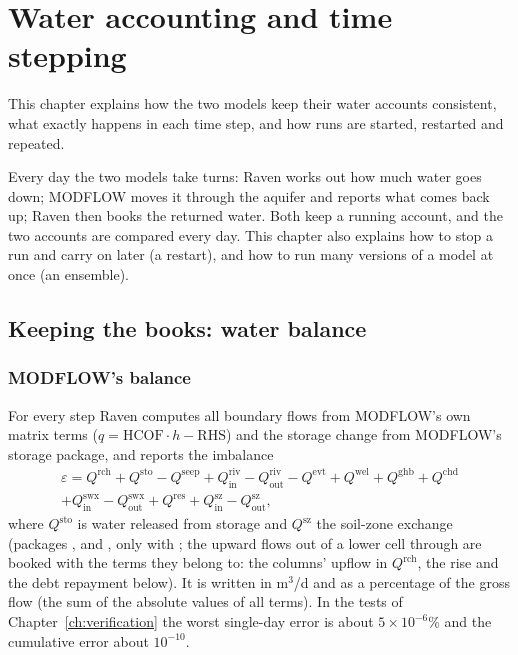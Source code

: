 \chapter{Water accounting and time stepping}\label{ch:c5}
This chapter explains how the two models keep their water accounts consistent, what exactly happens in each time step,
and how runs are started, restarted and repeated.

\begin{plain}
Every day the two models take turns: Raven works out how much water goes down; MODFLOW moves it through the aquifer and
reports what comes back up; Raven then books the returned water. Both keep a running account, and the two accounts are
compared every day. This chapter also explains how to stop a run and carry on later (a restart), and how to run many
versions of a model at once (an ensemble).
\end{plain}

\section{Keeping the books: water balance}\label{ch:balance}
\subsection{MODFLOW's balance}
For every step Raven computes all boundary flows from MODFLOW's own matrix terms ($q=\mathrm{HCOF}\cdot h-\mathrm{RHS}$)
and the storage change from MODFLOW's storage package, and reports the imbalance
\begin{multline}
\varepsilon=Q^{\mathrm{rch}}+Q^{\mathrm{sto}}-Q^{\mathrm{seep}}+Q^{\mathrm{riv}}_{\mathrm{in}}-Q^{\mathrm{riv}}_{\mathrm{out}}-Q^{\mathrm{evt}}
+Q^{\mathrm{wel}}+Q^{\mathrm{ghb}}+Q^{\mathrm{chd}}\\+Q^{\mathrm{swx}}_{\mathrm{in}}-Q^{\mathrm{swx}}_{\mathrm{out}}+Q^{\mathrm{res}}+Q^{\mathrm{sz}}_{\mathrm{in}}-Q^{\mathrm{sz}}_{\mathrm{out}},
\end{multline}
where $Q^{\mathrm{sto}}$ is water released from storage and $Q^{\mathrm{sz}}$ the soil-zone exchange (packages ,
 and , only with ; the upward flows out of a lower cell through
 are booked with the terms they belong to: the columns' upflow in $Q^{\mathrm{rch}}$, the rise and the
debt repayment below). It is written in m$^3$/d and as a percentage of the gross flow
(the sum of the absolute values of all terms). In the tests of Chapter~\ref{ch:verification} the worst single-day error is about $5\times10^{-6}$\% and the
cumulative error about $10^{-10}$.

